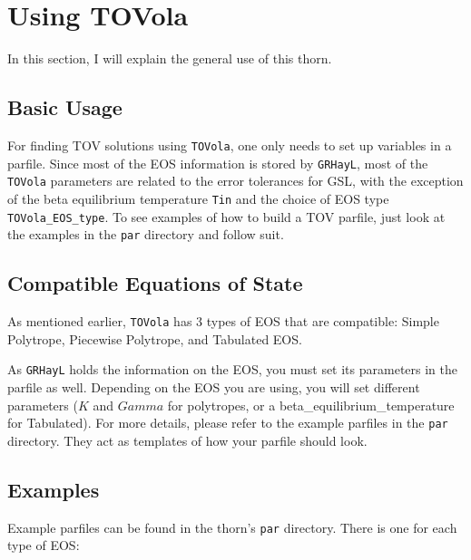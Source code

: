 \section{Using TOVola}

In this section, I will explain the general use of this thorn. 

\subsection{Basic Usage}

For finding TOV solutions using \texttt{TOVola}, one only needs to set up variables in a parfile. Since most of the EOS information is stored by \texttt{GRHayL}, most of the \texttt{TOVola} parameters are related to the error tolerances for GSL, with the exception of the beta equilibrium temperature \texttt{Tin} and the choice of EOS type \texttt{TOVola\_EOS\_type}. To see examples of how to build a TOV parfile, just look at the examples in the \texttt{par} directory and follow suit.

\subsection{Compatible Equations of State}

As mentioned earlier, \texttt{TOVola} has 3 types of EOS that are compatible: Simple Polytrope, Piecewise Polytrope, and Tabulated EOS.

As \texttt{GRHayL}\cite{TOVola_TOVola_GRHayL} holds the information on the EOS, you must set its parameters in the parfile as well. Depending on the EOS you are using, you will set different parameters ($K$ and $Gamma$ for polytropes, or a beta\_equilibrium\_temperature for Tabulated). For more details, please refer to the example parfiles in the \texttt{par} directory. They act as templates of how your parfile should look.

\subsection{Examples}

Example parfiles can be found in the thorn's \texttt{par} directory. There is one for each type of EOS:

